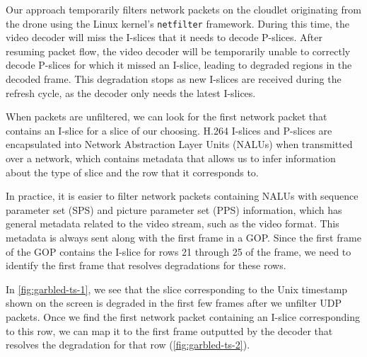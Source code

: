 Our approach temporarily filters network packets on the cloudlet originating
from the drone using the Linux kernel's \texttt{netfilter} framework. During
this time, the video decoder will miss the I-slices that it needs to decode
P-slices. After resuming packet flow, the video decoder will be temporarily
unable to correctly decode P-slices for which it missed an I-slice, leading to
degraded regions in the decoded frame. This degradation stops as new I-slices
are received during the refresh cycle, as the decoder only needs the latest
I-slices.

When packets are unfiltered, we can look for the first network packet that
contains an I-slice for a slice of our choosing. H.264 I-slices and P-slices
are encapsulated into Network Abstraction Layer Units (NALUs) when transmitted
over a network, which contains metadata that allows us to infer information
about the type of slice and the row that it corresponds to.

In practice, it is easier to filter network packets containing NALUs with
sequence parameter set (SPS) and picture parameter set (PPS) information, which
has general metadata related to the video stream, such as the video format.
This metadata is always sent along with the first frame in a GOP. Since the
first frame of the GOP contains the I-slice for rows 21 through 25 of the
frame, we need to identify the first frame that resolves degradations for these
rows.

In
\cref{fig:garbled-ts-1}, we see that the slice corresponding to the Unix
timestamp shown on the screen is degraded in the first few frames after we
unfilter UDP packets. Once we find the first network packet containing an
I-slice corresponding to this row, we can map it to the first frame outputted
by the decoder that resolves the degradation for that row
(\cref{fig:garbled-ts-2}).


